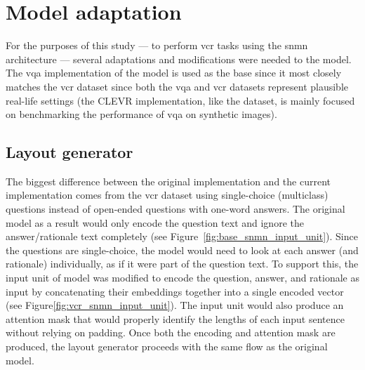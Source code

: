 \section{Model adaptation}
\label{sec:model_adaptation}

For the purposes of this study --- to perform \gls{vcr} tasks using the \gls{snmn} architecture --- several adaptations and modifications were needed to the model.
The \gls{vqa} implementation of the model is used as the base since it most closely matches the \gls{vcr} dataset since both the \gls{vqa} and \gls{vcr} datasets represent plausible real-life settings (the CLEVR implementation, like the dataset, is mainly focused on benchmarking the performance of \gls{vqa} on synthetic images).

\subsection{Layout generator}
\label{subsec:layout_generator}

The biggest difference between the original implementation and the current implementation comes from the \gls{vcr} dataset using single-choice (multiclass) questions instead of open-ended questions with one-word answers.
The original model as a result would only encode the question text and ignore the answer/rationale text completely (see Figure~\ref{fig:base_snmn_input_unit}).
Since the questions are single-choice, the model would need to look at each answer (and rationale) individually, as if it were part of the question text.
To support this, the input unit of model was modified to encode the question, answer, and rationale as input by concatenating their embeddings together into a single encoded vector (see Figure\ref{fig:vcr_snmn_input_unit}).
The input unit would also produce an attention mask that would properly identify the lengths of each input sentence without relying on padding.
Once both the encoding and attention mask are produced, the layout generator proceeds with the same flow as the original model.

